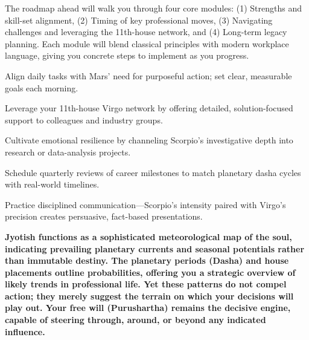 {\fontsize{9}{13}\selectfont The roadmap ahead will walk you through four core modules: (1) Strengths and skill-set alignment, (2) Timing of key professional moves, (3) Navigating challenges and leveraging the 11th-house network, and (4) Long-term legacy planning. Each module will blend classical principles with modern workplace language, giving you concrete steps to implement as you progress.}\par\vspace{1.8mm}

\begin{diamondlist}
  \item {\fontsize{8.5}{12}\selectfont Align daily tasks with Mars' need for purposeful action; set clear, measurable goals each morning.}
  \item {\fontsize{8.5}{12}\selectfont Leverage your 11th-house Virgo network by offering detailed, solution-focused support to colleagues and industry groups.}
  \item {\fontsize{8.5}{12}\selectfont Cultivate emotional resilience by channeling Scorpio's investigative depth into research or data-analysis projects.}
  \item {\fontsize{8.5}{12}\selectfont Schedule quarterly reviews of career milestones to match planetary dasha cycles with real-world timelines.}
  \item {\fontsize{8.5}{12}\selectfont Practice disciplined communication---Scorpio's intensity paired with Virgo's precision creates persuasive, fact-based presentations.}
\end{diamondlist}


\label{topic2}

{\fontsize{9.5}{13.8}\selectfont\bfseries\color{DeepSlate} Jyotish functions as a sophisticated meteorological map of the soul, indicating prevailing planetary currents and seasonal potentials rather than immutable destiny. The planetary periods (Dasha) and house placements outline probabilities, offering you a strategic overview of likely trends in professional life. Yet these patterns do not compel action; they merely suggest the terrain on which your decisions will play out. Your free will (Purushartha) remains the decisive engine, capable of steering through, around, or beyond any indicated influence.}\par\vspace{2mm}

